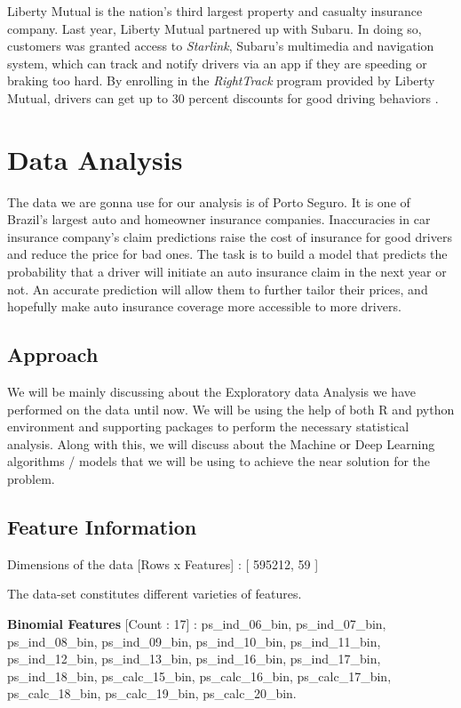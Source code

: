 Liberty Mutual is the nation's third largest property and casualty insurance company. Last year, Liberty Mutual partnered up with Subaru. In doing so, customers was granted access to {\em Starlink}, Subaru's multimedia and navigation system, which can track and notify drivers via an app if they are speeding or braking too hard. By enrolling in the {\em RightTrack} program provided by Liberty Mutual, drivers can get up to 30 percent discounts for good driving behaviors \cite{Fung2016turn}. 

\section{Data Analysis}
The data we are gonna use for our analysis is of Porto Seguro. It is one of Brazil's largest auto and homeowner insurance companies. Inaccuracies in car insurance company's claim predictions raise the cost of insurance for good drivers and reduce the price for bad ones. The task is to build a model that predicts the probability that a driver will initiate an auto insurance claim in the next year or not. An accurate prediction will allow them to further tailor their prices, and hopefully make auto insurance coverage more accessible to more drivers. 

\subsection{Approach}
We will be mainly discussing about the Exploratory data Analysis we have  performed on the data until now. We will be using the help of both R and python environment and supporting packages to perform the necessary statistical analysis. Along with this, we will discuss  about  the  Machine  or  Deep  Learning  algorithms  / models that we will be using to achieve the near solution for the problem.

\subsection{Feature Information}

Dimensions of the data [Rows x Features] : [ 595212, 59 ]
 
The data-set constitutes different varieties of features.
 
 \textbf{Binomial Features} [Count : 17] :  ps\_ind\_06\_bin,  ps\_ind\_07\_bin, ps\_ind\_08\_bin, ps\_ind\_09\_bin, ps\_ind\_10\_bin, ps\_ind\_11\_bin, ps\_ind\_12\_bin, ps\_ind\_13\_bin, ps\_ind\_16\_bin, ps\_ind\_17\_bin, ps\_ind\_18\_bin, ps\_calc\_15\_bin, ps\_calc\_16\_bin, ps\_calc\_17\_bin, ps\_calc\_18\_bin, ps\_calc\_19\_bin, ps\_calc\_20\_bin.

